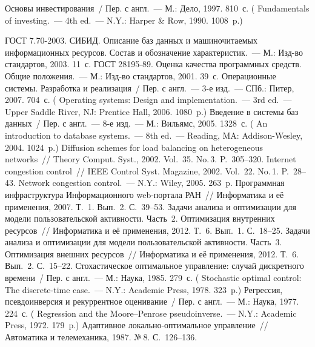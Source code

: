 \begin{multicols}{2}
{\small\frenchspacing
 {%
 \begin{thebibliography}{99}

 Основы инвестирования~/ Пер. с
англ.~--- М.: Дело, 1997. 810~с. (
Fundamentals of investing.~--- 4th ed.~--- N.Y.: Harper \& Row,
1990. 1008~p.)

ГОСТ 7.70-2003. СИБИД. Описание баз данных и машиночитаемых
информационных ресурсов. Состав и обозначение характеристик.~--- М.:
Изд-во стандартов, 2003. 11~с.
ГОСТ 28195-89. Оценка качества программных средств. Общие положения.~---
М.: Изд-во стандартов, 2001. 39~с.
 Операционные системы. Разработка и
реализация~/ Пер. с англ.~--- 3-е изд.~--- СПб.: Питер, 2007. 704~с.
( Operating systems: Design and
implementation.~--- 3rd ed.~--- Upper Saddle River, NJ: Prentice Hall, 2006.
1080~p.)
 Введение в системы баз данных~/ Пер. с англ.~--- 8-е изд.~---
М.: Вильямс, 2005. 1328~с. ( An introduction to database
systems.~--- 8th ed.~--- Reading, MA: Addison-Wesley, 2004. 1024~p.)
 Diffusion schemes for load
balancing on heterogeneous networks~// Theory Comput. Syst., 2002.
Vol.~35. No.\,3. P.~305--320.
 Internet congestion control~// IEEE
Control Syst. Magazine, 2002. Vol.~22. No.\,1. P.~28--43.
 Network congestion control.~--- N.Y.: Wiley, 2005. 263~p.
 Программная инфраструктура
Информационного web-пор\-та\-ла РАН~// Информатика и её применения,
2007. Т.~1. Вып.~2. С.~39--53.
 Задачи анализа и оптимизации для модели пользовательской
активности. Часть~2. Оптимизация внутренних ресурсов~// Информатика и её
применения, 2012. Т.~6. Вып.~1. С.~18--25.
 Задачи анализа и оптимизации для модели пользовательской
активности. Часть~3. Оптимизация внешних ресурсов~// Информатика и её
применения, 2012. Т.~6. Вып.~2. С.~15--22.
 Стохастическое оптимальное управление: случай
дискретного времени~/ Пер. с англ.~--- М.: Наука, 1985. 279~с.
( Stochastic optimal control: The
discrete-time case.~--- N.Y.: Academic Press, 1978. 323~p.)
 Регрессия, псевдоинверсия и рекуррентное оценивание~/ Пер. с
англ.~--- М.: Наука, 1977. 224~с. ( Regression and the
Moore--Penrose pseudoinverse.~--- N.Y.: Academic Press, 1972. 179~p.)
 Адаптивное
ло\-каль\-но-оп\-ти\-маль\-ное управление~// Автоматика и телемеханика, 1987.
№\,8. С.~126--136.

\end{thebibliography}

 }
 }

\end{multicols}


